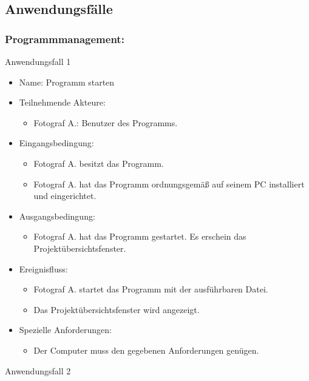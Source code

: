 \subsection{Anwendungsfälle}

	\subsubsection{Programmmanagement:}
	
	\begin{description}
	\item[Anwendungsfall 1]
	\end{description}
	
	\begin{itemize}
		\item Name: Programm starten
		\item Teilnehmende Akteure:
		\begin{itemize}
			\item	Fotograf A.: Benutzer des Programms.
		\end{itemize}
		\item Eingangsbedingung:
		\begin{itemize}
			\item Fotograf A. besitzt das Programm.
			\item Fotograf A. hat das Programm ordnungsgemäß auf seinem PC installiert und eingerichtet.						
		\end{itemize}
		\item Ausgangsbedingung:
		\begin{itemize}
			\item	Fotograf A. hat das Programm gestartet. Es erschein das Projektübersichtsfenster.		
		\end{itemize}
		\item Ereignisfluss:	
		\begin{itemize}
			\item Fotograf A. startet das Programm mit der ausführbaren Datei.		
			\item Das Projektübersichtsfenster wird angezeigt.
		\end{itemize}
		\item Spezielle Anforderungen:
		\begin{itemize}
			\item	Der Computer muss den gegebenen Anforderungen genügen.
		\end{itemize}
	\end{itemize}
	
	\begin{description}
	\item[Anwendungsfall 2]
	\end{description}
	
